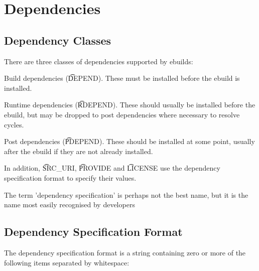 \chapter{Dependencies}
\label{dependencies}

\section{Dependency Classes}

There are three classes of dependencies supported by ebuilds:

\begin{bulletlist}
\item Build dependencies (\t{DEPEND}). These must be installed before the ebuild is installed.
\item Runtime dependencies (\t{RDEPEND}). These should usually be installed before the ebuild,
    but may be dropped to post dependencies where necessary to resolve cycles.
\item Post dependencies (\t{PDEPEND}). These should be installed at some point, usually after
    the ebuild if they are not already installed.
\end{bulletlist}

In addition, \t{SRC\_URI}, \t{PROVIDE} and \t{LICENSE} use the dependency specification format
to specify their values.

\note The term 'dependency specification' is perhaps not the best name, but it is the name
    most easily recognised by developers

\section{Dependency Specification Format}

The dependency specification format is a string containing zero or more of the following
items separated by whitespace:

